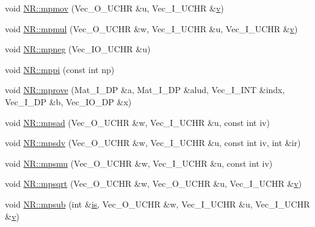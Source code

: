 \begin{DoxyCompactItemize}
void \mbox{\hyperlink{namespaceNR_a5a70131bd7cd4d907087ac645f6d095e}{N\+R\+::mpmov}} (Vec\+\_\+\+O\+\_\+\+U\+C\+HR \&u, Vec\+\_\+\+I\+\_\+\+U\+C\+HR \&\mbox{\hyperlink{adat__devel_2lib_2hadron_2hadron__timeslice_8cc_a716fc87f5e814be3ceee2405ed6ff22a}{v}})
\item 
void \mbox{\hyperlink{namespaceNR_ac6e31aebeef74f402f91cfb7133ee633}{N\+R\+::mpmul}} (Vec\+\_\+\+O\+\_\+\+U\+C\+HR \&w, Vec\+\_\+\+I\+\_\+\+U\+C\+HR \&u, Vec\+\_\+\+I\+\_\+\+U\+C\+HR \&\mbox{\hyperlink{adat__devel_2lib_2hadron_2hadron__timeslice_8cc_a716fc87f5e814be3ceee2405ed6ff22a}{v}})
\item 
void \mbox{\hyperlink{namespaceNR_a685e7aacef1a2fa63acc2b0075848293}{N\+R\+::mpneg}} (Vec\+\_\+\+I\+O\+\_\+\+U\+C\+HR \&u)
\item 
void \mbox{\hyperlink{namespaceNR_a994c170707a8aab5444d4d126e7a7d23}{N\+R\+::mppi}} (const int np)
\item 
void \mbox{\hyperlink{namespaceNR_a0c4cae16b0250ecbf95693adf73c8bdc}{N\+R\+::mprove}} (Mat\+\_\+\+I\+\_\+\+DP \&a, Mat\+\_\+\+I\+\_\+\+DP \&alud, Vec\+\_\+\+I\+\_\+\+I\+NT \&indx, Vec\+\_\+\+I\+\_\+\+DP \&b, Vec\+\_\+\+I\+O\+\_\+\+DP \&x)
\item 
void \mbox{\hyperlink{namespaceNR_a73ec9a62342ed00c7ed70bfedecf5947}{N\+R\+::mpsad}} (Vec\+\_\+\+O\+\_\+\+U\+C\+HR \&w, Vec\+\_\+\+I\+\_\+\+U\+C\+HR \&u, const int iv)
\item 
void \mbox{\hyperlink{namespaceNR_afb23bc7a9b2440c5a3db4da885920358}{N\+R\+::mpsdv}} (Vec\+\_\+\+O\+\_\+\+U\+C\+HR \&w, Vec\+\_\+\+I\+\_\+\+U\+C\+HR \&u, const int iv, int \&ir)
\item 
void \mbox{\hyperlink{namespaceNR_a7e4bcd285f6961beca936346cd63f092}{N\+R\+::mpsmu}} (Vec\+\_\+\+O\+\_\+\+U\+C\+HR \&w, Vec\+\_\+\+I\+\_\+\+U\+C\+HR \&u, const int iv)
\item 
void \mbox{\hyperlink{namespaceNR_a73de1f888d26e631949996bd1e437659}{N\+R\+::mpsqrt}} (Vec\+\_\+\+O\+\_\+\+U\+C\+HR \&w, Vec\+\_\+\+O\+\_\+\+U\+C\+HR \&u, Vec\+\_\+\+I\+\_\+\+U\+C\+HR \&\mbox{\hyperlink{adat__devel_2lib_2hadron_2hadron__timeslice_8cc_a716fc87f5e814be3ceee2405ed6ff22a}{v}})
\item 
void \mbox{\hyperlink{namespaceNR_a6c829dc4c09a73a1c6f91c817b01bfd4}{N\+R\+::mpsub}} (int \&\mbox{\hyperlink{x_8cc_a81abbbdef81e25584a2eab888e643d3d}{is}}, Vec\+\_\+\+O\+\_\+\+U\+C\+HR \&w, Vec\+\_\+\+I\+\_\+\+U\+C\+HR \&u, Vec\+\_\+\+I\+\_\+\+U\+C\+HR \&\mbox{\hyperlink{adat__devel_2lib_2hadron_2hadron__timeslice_8cc_a716fc87f5e814be3ceee2405ed6ff22a}{v}})
\item 

\end{DoxyCompactItemize}
